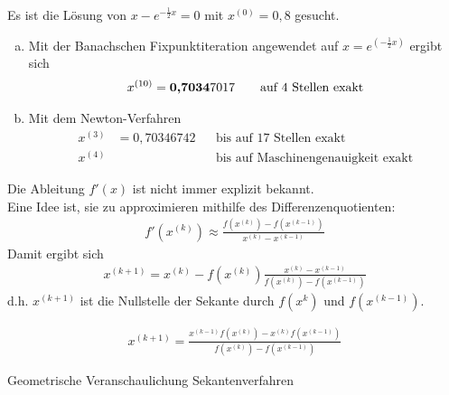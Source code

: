 \begin{Bspe}
  \label{5.4.6}
  Es ist die Lösung von $x-e^{-\frac{1}{2}x}=0$ mit $x^{(0)}=0,8$ gesucht.
  \begin{enumerate}[a)]
  \item Mit der Banachschen Fixpunktiteration angewendet auf 
    $x=e^{(-\frac{1}{2}x)}$ ergibt sich
    \begin{gather*}
      x^{(10)}=\text{\textbf{0,7034}}7017 
      \qquad \text{auf 4 Stellen exakt}
    \end{gather*}
  \item Mit dem Newton-Verfahren
    \begin{align*}
      x^{(3)}&= 0,70346742 &&\text{bis auf 17 Stellen exakt}\\
      x^{(4)} &&& \text{bis auf Maschinengenauigkeit exakt}
    \end{align*}		
  \end{enumerate}
\end{Bspe}
Die Ableitung $f'(x)$ ist nicht immer explizit bekannt. \\
Eine Idee ist, sie zu approximieren mithilfe des Differenzenquotienten:
\begin{gather*}
  f'(x^{(k)})  \approx \frac{f(x^{(k)})-f(x^{(k-1)})}{x^{(k)}-x^{(k-1)}}
\end{gather*}
Damit ergibt sich
\begin{gather*}
  x^{(k+1)} = x^{(k)}-f(x^{(k)}) \frac{x^{(k)} - x^{(k-1)}}{f(x^{(k)})-f(x^{(k-1)})}
\end{gather*}
d.h. $x^{(k+1)} $ ist die Nullstelle der Sekante durch $f(x^{k})$ und $f(x^{(k-1)})$.


\begin{gather}
  x^{(k+1)} = \frac{x^{(k-1)}f(x^{(k)}) - x^{(k)}f(x^{(k-1)})}{f(x^{(k)})-f(x^{(k-1)})}
  \label{V.4.2}
\end{gather}


\begin{image}{Geometrische Veranschaulichung Sekantenverfahren}
\end{image}
\label{im5.4.7}


